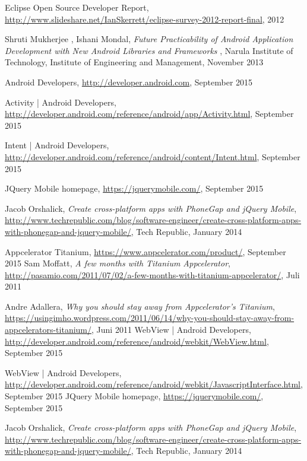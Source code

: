 \begin{thebibliography}{9}
	Eclipse Open Source Developer Report, 
	\url{http://www.slideshare.net/IanSkerrett/eclipse-survey-2012-report-final},
	2012
	
	Shruti Mukherjee , Ishani Mondal, 
	\emph{Future Practicability of Android Application Development with New Android Libraries and Frameworks },
	Narula Institute of Technology, 
	Institute of Engineering and Management,
	November 2013 
	
	Android Developers,
	\url{http://developer.android.com},
	September 2015

	Activity | Android Developers,
	\url{http://developer.android.com/reference/android/app/Activity.html},
	September 2015
	
	Intent | Android Developers,
	\url{http://developer.android.com/reference/android/content/Intent.html},
	September 2015

	JQuery Mobile homepage,
	\url{https://jquerymobile.com/},
	September 2015

Jacob Orshalick,
\emph{Create cross-platform apps with PhoneGap and jQuery Mobile},
\url{http://www.techrepublic.com/blog/software-engineer/create-cross-platform-apps-with-phonegap-and-jquery-mobile/},
	Tech Republic,
	January 2014

	Appcelerator Titanium,
	\url{https://www.appcelerator.com/product/},
	September 2015
	Sam Moffatt,
	\emph{A few months with Titanium Appcelerator},
	\url{http://pasamio.com/2011/07/02/a-few-months-with-titanium-appcelerator/},
	Juli 2011

	Andre Adallera,
\emph{Why you should stay away from Appcelerator’s Titanium},
\url{https://usingimho.wordpress.com/2011/06/14/why-you-should-stay-away-from-appcelerators-titanium/},
	Juni 2011
	WebView | Android Developers,
	\url{http://developer.android.com/reference/android/webkit/WebView.html},
	September 2015

	WebView | Android Developers,
	\url{http://developer.android.com/reference/android/webkit/JavascriptInterface.html},
	September 2015
	JQuery Mobile homepage,
	\url{https://jquerymobile.com/},
	September 2015

Jacob Orshalick,
\emph{Create cross-platform apps with PhoneGap and jQuery Mobile},
\url{http://www.techrepublic.com/blog/software-engineer/create-cross-platform-apps-with-phonegap-and-jquery-mobile/},
	Tech Republic,
	January 2014


\end{thebibliography}
